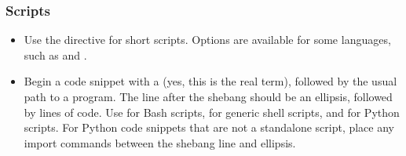 \documentclass[letterpaper,10pt,english]{sphinxmanual}
\begin{document}
\subsubsection{Scripts}
\label{\detokenize{development/style_guide:scripts}}\begin{itemize}
\item {} 
Use the  directive for short scripts. Options are
available for some languages, such as  and
.

\end{itemize}

\begin{sphinxVerbatim}[commandchars=\\\{\}]

 
\end{sphinxVerbatim}

\begin{sphinxVerbatim}[commandchars=\\\{\}]

 
      
   
\end{sphinxVerbatim}
\begin{itemize}
\item {} 
Begin a code snippet with a \sphinxcode{\sphinxupquote{\#!}}  (yes, this is the real term),
followed by the usual path to a program. The line after the shebang should be
an ellipsis, followed by lines of code. Use  for Bash scripts,
 for generic shell scripts, and  for
Python scripts. For Python code snippets that are not a stand\sphinxhyphen{}alone script,
place any import commands between the shebang line and ellipsis.

\end{itemize}
\end{document}
